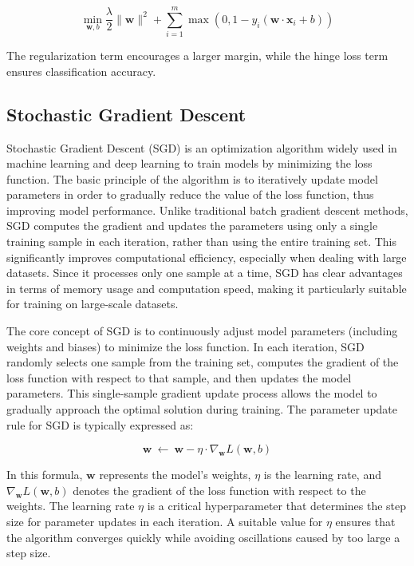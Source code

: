 \documentclass[a4paper, utf8]{ctexart}
\begin{document}
	\vspace{-.75em}
	\begin{equation}
		\min_{\boldsymbol{w}, b} \frac{\lambda}{2} \|\boldsymbol{w}\|^2 + \sum_{i=1}^m \max(0, 1 - y_i (\boldsymbol{w} \cdot \boldsymbol{x}_i + b))
	\end{equation}
	
	The regularization term encourages a larger margin, while the hinge loss term ensures classification accuracy.
	
	\subsection{Stochastic Gradient Descent}
	
	Stochastic Gradient Descent (SGD) is an optimization algorithm widely used in machine learning and deep learning to train models by minimizing the loss function. The basic principle of the algorithm is to iteratively update model parameters in order to gradually reduce the value of the loss function, thus improving model performance. Unlike traditional batch gradient descent methods, SGD computes the gradient and updates the parameters using only a single training sample in each iteration, rather than using the entire training set. This significantly improves computational efficiency, especially when dealing with large datasets. Since it processes only one sample at a time, SGD has clear advantages in terms of memory usage and computation speed, making it particularly suitable for training on large-scale datasets.
	
	The core concept of SGD is to continuously adjust model parameters (including weights and biases) to minimize the loss function. In each iteration, SGD randomly selects one sample from the training set, computes the gradient of the loss function with respect to that sample, and then updates the model parameters. This single-sample gradient update process allows the model to gradually approach the optimal solution during training. The parameter update rule for SGD is typically expressed as:

	\vspace{-.75em}
	\begin{equation}
		\boldsymbol{w} \ \leftarrow \  \boldsymbol{w} - \eta \cdot \nabla_{\boldsymbol{w}}L(\boldsymbol{w}, b)
	\end{equation}

	In this formula, $\boldsymbol{w}$ represents the model's weights, $\eta$ is the learning rate, and $\nabla_{\boldsymbol{w}}L(\boldsymbol{w}, b)$ denotes the gradient of the loss function with respect to the weights. The learning rate $\eta$ is a critical hyperparameter that determines the step size for parameter updates in each iteration. A suitable value for $\eta$ ensures that the algorithm converges quickly while avoiding oscillations caused by too large a step size.
	
\end{document}
